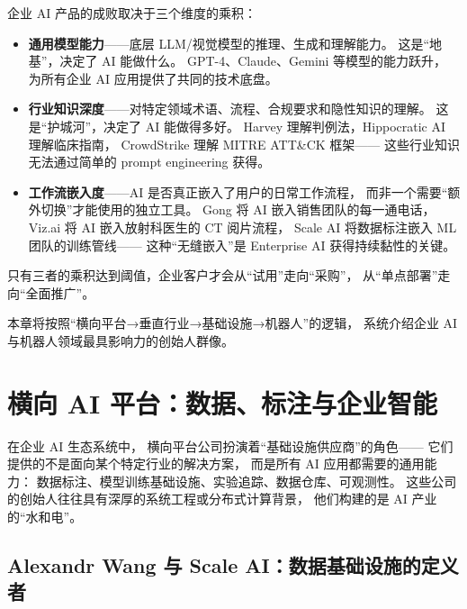 \begin{keybox}
企业 AI 产品的成败取决于三个维度的乘积：
\begin{itemize}[noitemsep]
  \item \textbf{通用模型能力}——底层 LLM/视觉模型的推理、生成和理解能力。
        这是``地基''，决定了 AI 能做什么。
        GPT-4、Claude、Gemini 等模型的能力跃升，
        为所有企业 AI 应用提供了共同的技术底盘。
  \item \textbf{行业知识深度}——对特定领域术语、流程、合规要求和隐性知识的理解。
        这是``护城河''，决定了 AI 能做得多好。
        Harvey 理解判例法，Hippocratic AI 理解临床指南，
        CrowdStrike 理解 MITRE ATT\&CK 框架——
        这些行业知识无法通过简单的 prompt engineering 获得。
  \item \textbf{工作流嵌入度}——AI 是否真正嵌入了用户的日常工作流程，
        而非一个需要``额外切换''才能使用的独立工具。
        Gong 将 AI 嵌入销售团队的每一通电话，
        Viz.ai 将 AI 嵌入放射科医生的 CT 阅片流程，
        Scale AI 将数据标注嵌入 ML 团队的训练管线——
        这种``无缝嵌入''是 Enterprise AI 获得持续黏性的关键。
\end{itemize}
只有三者的乘积达到阈值，企业客户才会从``试用''走向``采购''，
从``单点部署''走向``全面推广''。
\end{keybox}

本章将按照``横向平台→垂直行业→基础设施→机器人''的逻辑，
系统介绍企业 AI 与机器人领域最具影响力的创始人群像。


\section{横向 AI 平台：数据、标注与企业智能}
\label{sec:ent-horizontal}

在企业 AI 生态系统中，
横向平台公司扮演着``基础设施供应商''的角色——
它们提供的不是面向某个特定行业的解决方案，
而是所有 AI 应用都需要的通用能力：
数据标注、模型训练基础设施、实验追踪、数据仓库、可观测性。
这些公司的创始人往往具有深厚的系统工程或分布式计算背景，
他们构建的是 AI 产业的``水和电''。

\subsection{Alexandr Wang 与 Scale AI：数据基础设施的定义者}
\label{subsec:alexandr-wang}

